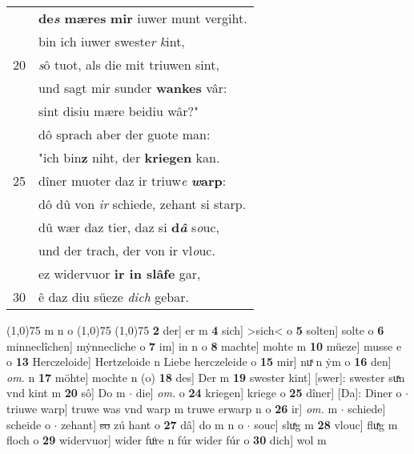 \documentclass[8pt,a4paper,notitlepage]{article}
\begin{document}
\begin{table}[ht]
\begin{minipage}[t]{0.5\linewidth}
\begin{tabular}{rl}
 & \textbf{de\textit{s} mæres} \textbf{mir} iuwer munt vergiht.\\ 
 & bin ich iuwer sweste\textit{r} \textit{k}int,\\ 
20 & \textit{s}ô tuot, als die mit triuwen sint,\\ 
 & und sagt mir sunder \textbf{wankes} vâr:\\ 
 & sint disiu mære beidiu wâr?"\\ 
 & dô sprach aber der guote man:\\ 
 & "ich bin\textbf{z} niht, der \textbf{kriegen} kan.\\ 
25 & dîner muoter daz ir triuw\textit{e} \textbf{\textit{w}arp}:\\ 
 & dô dû von \textit{ir} schiede, zehant si starp.\\ 
 & dû wær daz tier, daz si \textbf{d\textit{â}} s\textit{o}uc,\\ 
 & und der trach, der von ir vl\textit{o}uc.\\ 
 & ez widervuor \textbf{ir in slâfe} gar,\\ 
30 & ê daz diu süeze \textit{dich} gebar.\\ 
\end{tabular}
\scriptsize
\line(1,0){75} \newline
m n o \newline
\line(1,0){75} \newline
\newline
\line(1,0){75} \newline
\textbf{2} der] er m \textbf{4} sich] >sich< o \textbf{5} solten] solte o \textbf{6} minneclîchen] mẏnnecliche o \textbf{7} im] in n o \textbf{8} machte] mohte m \textbf{10} müeze] musse e o \textbf{13} Herczeloide] Hertzeloide n Liebe herczeleide o \textbf{15} mir] nuͯ n ẏm o \textbf{16} den] \textit{om.} n \textbf{17} möhte] mochte n (o) \textbf{18} des] Der m \textbf{19} swester kint] [swer]: swester suͯn vnd kint m \textbf{20} sô] Do m  $\cdot$ die] \textit{om.} o \textbf{24} kriegen] kriege o \textbf{25} dîner] [Da]: Diner o  $\cdot$ triuwe warp] truwe was vnd warp m truwe erwarp n o \textbf{26} ir] \textit{om.} m  $\cdot$ schiede] scheide o  $\cdot$ zehant] \sout{so} zú hant o \textbf{27} dâ] do m n o  $\cdot$ souc] sluͯg m \textbf{28} vlouc] fluͯg m floch o \textbf{29} widervuor] wider fuͦre n fúr wider fúr o \textbf{30} dich] wol m \newline
\end{minipage}
\end{table}
\newpage
\end{document}
